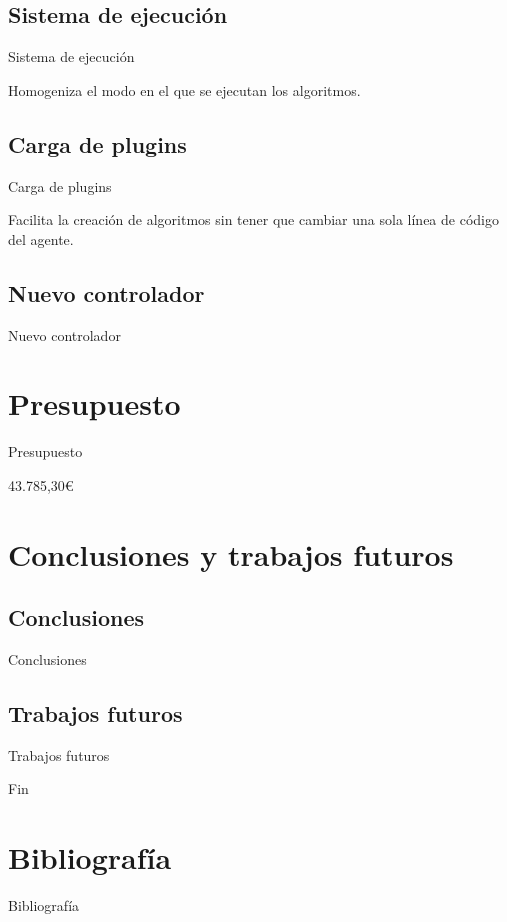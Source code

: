\documentclass[12pt]{beamer}
\begin{document}
\subsection{Sistema de ejecución}
\begin{frame}{Sistema de ejecución}
	\begin{center}
		Homogeniza el modo en el que se ejecutan los algoritmos.
	\end{center}
\end{frame}

\subsection{Carga de plugins}
\begin{frame}{Carga de plugins}
	\begin{center}
		Facilita la creación de algoritmos sin tener que cambiar una sola línea de código del agente.
	\end{center}
\end{frame}

\subsection{Nuevo controlador}
\begin{frame}{Nuevo controlador}

\end{frame}



\section{Presupuesto}
\begin{frame}{Presupuesto}
	\begin{center}
		43.785,30\euro
	\end{center}
\end{frame}


\section{Conclusiones y trabajos futuros}
\subsection{Conclusiones}
\begin{frame}{Conclusiones}
\end{frame}

\subsection{Trabajos futuros}
\begin{frame}{Trabajos futuros}
\end{frame}

\begin{frame}
	\begin{center}
		\Huge Fin
	\end{center}
\end{frame}

\section{Bibliografía}
\begin{frame}[allowframebreaks]{Bibliografía}
	
	
\end{frame}
\end{document}
